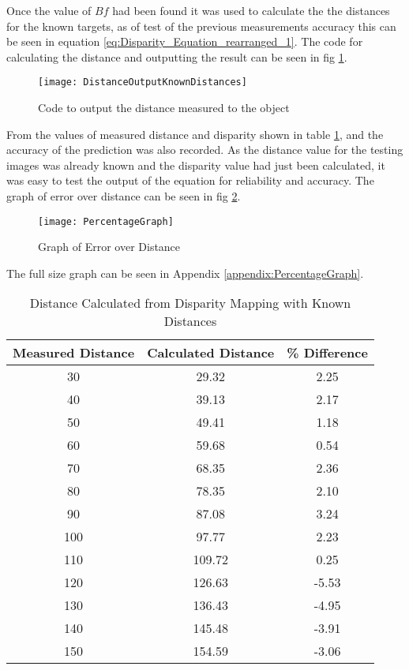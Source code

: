 \documentclass[conference]{IEEEtran}
\begin{document}
Once the value of $Bf$ had been found it was used to calculate the the distances for the known targets, as of test of the previous measurements accuracy this can be seen in equation \ref{eq:Disparity_Equation_rearranged_1}. The code for calculating the distance and outputting the result can be seen in fig \ref{fig:DistanceOutputKnownDistances}.

\begin{figure}[H]
\centerline{\texttt{[image: DistanceOutputKnownDistances]}}
\caption{Code to output the distance measured to the object}
\label{fig:DistanceOutputKnownDistances}
\end{figure}

From the values of measured distance and disparity shown in table \ref{table:distance_values_for_known_values}, and the accuracy of the prediction was also recorded. As the distance value for the testing images was already known and the disparity value had just been calculated, it was easy to test the output of the equation for reliability and accuracy. The graph of error over distance can be seen in fig \ref{fig:PercentageGraph}.

\begin{figure}[H]
\centerline{\texttt{[image: PercentageGraph]}}
\caption{Graph of Error over Distance}
\label{fig:PercentageGraph}
\end{figure}

The full size graph can be seen in Appendix \ref{appendix:PercentageGraph}.

\begin{table}
\begin{center}
\caption{Distance Calculated from Disparity Mapping with Known Distances}
\begin{tabular}{ || c || c || c || }
\hline
 Measured Distance & Calculated Distance & \% Difference\\ 
\hline
 30 & 29.32 & 2.25 \\  
\hline
 40 & 39.13 & 2.17 \\  
\hline
 50 & 49.41 & 1.18 \\  
\hline
 60 & 59.68 & 0.54 \\  
\hline
 70 & 68.35 & 2.36 \\  
\hline
 80 & 78.35 & 2.10 \\  
\hline
 90 & 87.08 & 3.24 \\  
\hline
 100 & 97.77 & 2.23 \\  
\hline
 110 & 109.72 & 0.25 \\  
\hline
 120 & 126.63 & -5.53 \\  
\hline
 130 & 136.43 & -4.95 \\  
\hline
 140 & 145.48 & -3.91 \\  
\hline
 150 & 154.59 & -3.06 \\  
\hline

\end{tabular}
\label{table:distance_values_for_known_values}
\end{center}
\end{table}
\end{document}
